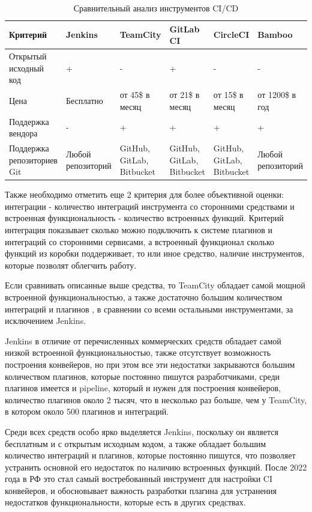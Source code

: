 \begin{table}
    \centering
    \caption{Сравнительный анализ инструментов CI/CD}
    \begin{tabular}{|p{3cm}|p{2cm}|p{2cm}|p{2cm}|p{2cm}|p{2cm}|}
    \hline
        Критерий & Jenkins & TeamCity & GitLab CI & CircleCI & Bamboo \\ \hline
        Открытый исходный код & + & - & + & - & - \\ \hline
        Цена & Бесплатно & от 45\$ в месяц \cite{cianalyze} & от 21\$ в месяц \cite{gitlabprice} & от 15\$ в месяц \cite{cianalyze} & от 1200\$ в год \cite{cianalyze} \\ \hline
        Поддержка вендора & - & + & + &+ & + \\ \hline
        Поддержка репозиториев Git & Любой репозиторий & GitHub, GitLab, Bitbucket & GitHub, GitLab, Bitbucket  & GitHub, GitLab, Bitbucket & Любой репозиторий  \\ \hline

    \end{tabular}
\end{table}	

Также необходимо отметить еще 2 критерия для более объективной оценки: интеграции - количество интеграций инструмента со сторонними средствами и встроенная функциональность - количество встроенных функций.
Критерий интеграция показывает сколько можно подключить к системе плагинов и интеграций со сторонними сервисами, а встроенный функционал сколько функций из коробки поддерживает, то или иное средство, наличие инструментов, которые позволят облегчить работу.

Если сравнивать описанные выше средства, то TeamCity обладает самой мощной встроенной функциональностью, а также достаточно большим количеством интеграций и плагинов \cite{cianalyze}, в сравнении со всеми остальными инструментами, за исключением Jenkins.

Jenkins в отличие от перечисленных коммерческих средств обладает самой низкой встроенной функциональностью, также отсутствует возможность построения конвейеров, но при этом все эти недостатки закрываются большим количеством плагинов, которые постоянно пишутся разработчиками, среди плагинов имеется и pipeline, который и нужен для построения конвейеров, количество плагинов около 2 тысяч, что в несколько раз больше, чем у TeamCity, в котором около 500 плагинов и интеграций.

Среди всех средств особо ярко выделяется Jenkins, поскольку он является бесплатным и с открытым исходным кодом, а также обладает большим количество интеграций и плагинов, которые постоянно пишутся, что позволяет устранить основной его недостаток по наличию встроенных функций. После 2022 года в РФ это стал самый востребованный инструмент для настройки CI конвейеров, и обосновывает важность разработки плагина для устранения недостатков функциональности, которые есть в других средствах.
 
